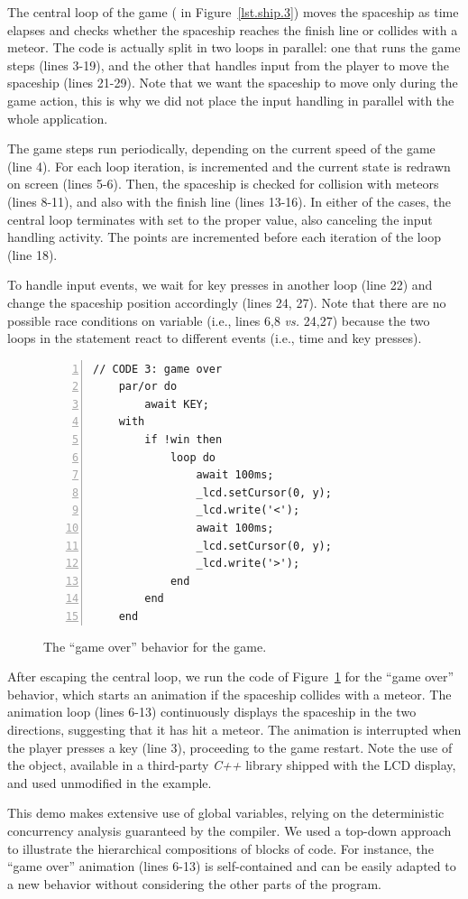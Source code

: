The central loop of the game (  in Figure~\ref{lst.ship.3}) moves 
the spaceship as time elapses and checks whether the spaceship reaches the 
finish line or collides with a meteor.
%
The code is actually split in two loops in parallel: one that runs the game 
steps (lines 3-19), and the other that handles input from the player to move 
the spaceship (lines 21-29).
Note that we want the spaceship to move only during the game action, this is 
why we did not place the input handling in parallel with the whole application.

The game steps run periodically, depending on the current speed of the game 
(line 4).
For each loop iteration,  is incremented and the current state is 
redrawn on screen (lines 5-6).
Then, the spaceship is checked for collision with meteors (lines 8-11), and 
also with the finish line (lines 13-16).
In either of the cases, the central loop terminates with  set to the 
proper value, also canceling the input handling activity.
The points are incremented before each iteration of the loop (line 18).

To handle input events, we wait for key presses in another loop (line 22) and 
change the spaceship position accordingly (lines 24, 27).
Note that there are no possible race conditions on variable  (i.e., 
lines 6,8 \emph{vs.} 24,27) because the two loops in the  
statement react to different events (i.e., time and key presses).

\begin{figure}[ht]
\begin{lstlisting}[numbers=left,xleftmargin=2em]
    // CODE 3: game over
    par/or do
        await KEY;
    with
        if !win then
            loop do
                await 100ms;
                _lcd.setCursor(0, y);
                _lcd.write('<');
                await 100ms;
                _lcd.setCursor(0, y);
                _lcd.write('>');
            end
        end
    end
\end{lstlisting}
\caption{ The ``game over'' behavior for the game.
{\small %
}%
\label{lst.ship.4}
}
\end{figure}

After escaping the central loop, we run the code of Figure~\ref{lst.ship.4} for 
the ``game over'' behavior, which starts an animation if the spaceship collides 
with a meteor.
%
The animation loop (lines 6-13) continuously displays the spaceship in the two 
directions, suggesting that it has hit a meteor.
The animation is interrupted when the player presses a key (line 3), proceeding 
to the game restart.
Note the use of the  object, available in a third-party \emph{C++} 
library shipped with the LCD display, and used unmodified in the example.

This demo makes extensive use of global variables, relying on the
deterministic concurrency analysis guaranteed by the \CEU compiler.
We used a top-down approach to illustrate the hierarchical compositions of 
blocks of code.
For instance, the ``game over'' animation (lines 6-13) is self-contained and 
can be easily adapted to a new behavior without considering the other parts of 
the program.
